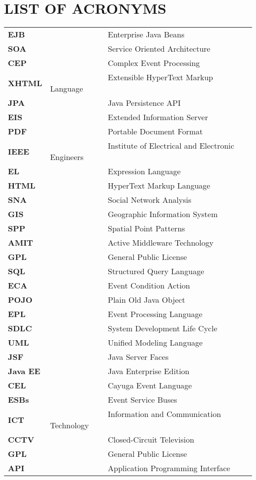 \section*{LIST OF ACRONYMS}
\pagestyle{plain}
\begin{tabular}{lll}
{\bf EJB }&~~~~~~~~~~~~~~ 	        Enterprise Java Beans\\
{\bf SOA}&~~~~~~~~~~~~~~                Service Oriented Architecture\\
{\bf CEP}&~~~~~~~~~~~~~~ 		Complex Event Processing \\
{\bf XHTML}&~~~~~~~~~~~~~~              Extensible HyperText Markup Language  \\
{\bf JPA}&~~~~~~~~~~~~~~               	Java Persistence API\\
{\bf EIS}&~~~~~~~~~~~~~~ 		Extended Information Server\\
{\bf PDF}&~~~~~~~~~~~~~~ 		Portable Document Format\\
{\bf IEEE}&~~~~~~~~~~~~~~ 	        Institute of Electrical and Electronic Engineers\\ 
{\bf EL}&~~~~~~~~~~~~~~ 		Expression Language \\
{\bf HTML}&~~~~~~~~~~~~~~ 		HyperText Markup Language\\
{\bf SNA}&~~~~~~~~~~~~~~ 		Social Network Analysis\\
{\bf GIS}&~~~~~~~~~~~~~~ 		Geographic Information System\\
{\bf SPP}&~~~~~~~~~~~~~~ 	        Spatial Point Patterns\\
{\bf AMIT}&~~~~~~~~~~~~~~ 		Active Middleware Technology\\
{\bf GPL}&~~~~~~~~~~~~~~ 		General Public License\\
{\bf SQL }&~~~~~~~~~~~~~~ 		Structured Query Language\\
{\bf ECA}&~~~~~~~~~~~~~~ 		Event Condition Action\\
{\bf POJO}&~~~~~~~~~~~~~~ 		Plain Old Java Object\\
{\bf EPL}&~~~~~~~~~~~~~~ 	        Event Processing Language\\
{\bf SDLC}&~~~~~~~~~~~~~~ 	        System Development Life Cycle\\
{\bf UML}&~~~~~~~~~~~~~~ 	        Unified Modeling Language\\
{\bf JSF}&~~~~~~~~~~~~~~ 	        Java Server Faces\\
{\bf Java EE}&~~~~~~~~~~~~~~ 	        Java Enterprise Edition\\
{\bf CEL}&~~~~~~~~~~~~~~ 	        Cayuga Event Language\\
{\bf ESBs}&~~~~~~~~~~~~~~ 	        Event Service Buses\\
{\bf ICT}&~~~~~~~~~~~~~~ 	        Information and Communication Technology\\
{\bf CCTV}&~~~~~~~~~~~~~~ 	        Closed-Circuit Television\\
{\bf GPL}&~~~~~~~~~~~~~~ 	        General Public License\\
{\bf API}&~~~~~~~~~~~~~~ 	        Application Programming Interface\\

\end{tabular}

